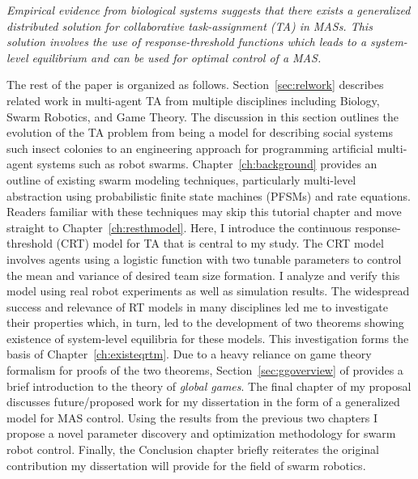 \documentclass[defaultstyle,12pt]{proposal}
\begin{document}
\emph{Empirical evidence from biological systems suggests that there exists a generalized distributed solution for collaborative task-assignment (TA) in MASs. This solution involves the use of response-threshold functions which leads to a system-level equilibrium and can be used for optimal control of a MAS.}

The rest of the paper is organized as follows. Section~\ref{sec:relwork} describes related work in multi-agent TA from multiple disciplines including Biology, Swarm Robotics, and Game Theory. The discussion in this section outlines the evolution of the TA problem from being a model  for describing social systems such insect colonies to an engineering approach for programming artificial multi-agent systems such as robot swarms. Chapter~\ref{ch:background} provides an outline of existing swarm modeling techniques, particularly multi-level abstraction using probabilistic finite state machines (PFSMs) and rate equations. Readers familiar with these techniques may skip this tutorial chapter and move straight to Chapter~\ref{ch:resthmodel}. Here, I introduce the continuous response-threshold (CRT) model for TA that is central to my study. The CRT model involves agents using a logistic function with two tunable parameters to control the mean and variance of desired team size formation. I analyze and verify this model using real robot experiments as well as simulation results. The widespread success and relevance of RT models in many disciplines led me to investigate their properties which, in turn, led to the development of two theorems showing existence of system-level equilibria for these models. This investigation forms the basis of Chapter~\ref{ch:existeqrtm}. Due to a heavy reliance on game theory formalism for proofs of the two theorems, Section~\ref{sec:ggoverview} of provides a brief introduction to the theory of \emph{global games}. The final chapter of my proposal discusses future/proposed work for my dissertation in the form of a generalized model for MAS control. Using the results from the previous two chapters I propose a novel parameter discovery and optimization methodology for swarm robot control. Finally, the Conclusion chapter briefly reiterates the original contribution my dissertation will provide for the field of swarm robotics.
\end{document}
